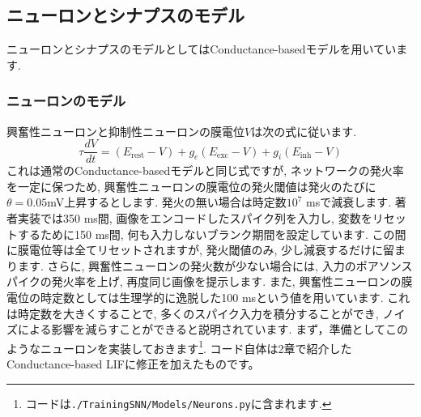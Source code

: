 \subsection{ニューロンとシナプスのモデル}
ニューロンとシナプスのモデルとしてはConductance-basedモデルを用いています. 
\subsubsection{ニューロンのモデル}
興奮性ニューロンと抑制性ニューロンの膜電位$V$は次の式に従います. 
\begin{equation}
\tau \frac{d V}{d t}=\left(E_{\text {rest}}-V\right)+g_{e}\left(E_{\text {exc}}-V\right)+g_{i}\left(E_{\text {inh}}-V\right)    
\end{equation}
これは通常のConductance-basedモデルと同じ式ですが, ネットワークの発火率を一定に保つため, 興奮性ニューロンの膜電位の発火閾値は発火のたびに$\theta=0.05 $mV上昇するとします. 発火の無い場合は時定数$10^7$ msで減衰します. 著者実装では350 ms間, 画像をエンコードしたスパイク列を入力し, 変数をリセットするために150 ms間, 何も入力しないブランク期間を設定しています. この間に膜電位等は全てリセットされますが, 発火閾値のみ, 少し減衰するだけに留まります. さらに, 興奮性ニューロンの発火数が少ない場合には, 入力のポアソンスパイクの発火率を上げ, 再度同じ画像を提示します. 
また, 興奮性ニューロンの膜電位の時定数としては生理学的に逸脱した100 msという値を用いています. これは時定数を大きくすることで, 多くのスパイク入力を積分することができ, ノイズによる影響を減らすことができると説明されています. 
まず，準備としてこのようなニューロンを実装しておきます\footnote{コードは\texttt{./TrainingSNN/Models/Neurons.py}に含まれます. }. コード自体は2章で紹介したConductance-based LIFに修正を加えたものです。

